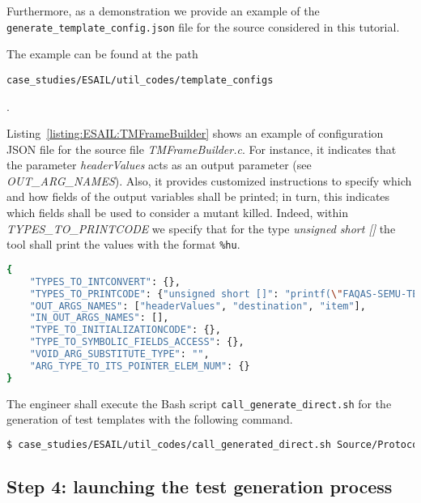 Furthermore, as a demonstration we provide an example of the \texttt{generate\_template\_config.json} file for the source considered in this tutorial.

The example can be found at the path \begin{small}\texttt{case\_studies/ESAIL/util\_codes/template\_configs}\end{small}.

Listing~\ref{listing:ESAIL:TMFrameBuilder} shows an example of configuration JSON file for the source file \emph{TMFrameBuilder.c}. For instance, it indicates that the parameter \emph{headerValues} acts as an output parameter (see \emph{OUT\_ARG\_NAMES}). Also, it provides customized instructions to specify which and how fields of the output variables shall be printed; in turn, this indicates which fields shall be used to consider a mutant killed. Indeed, within \emph{TYPES\_TO\_PRINTCODE} we specify that for the type \emph{unsigned short []} the tool shall print the values with the format \texttt{\%hu}.

\begin{lstlisting}[language=bash,label=listing:ESAIL:TMFrameBuilder,caption=JSON configuration file for TMFrameBuilder.c.]
{
    "TYPES_TO_INTCONVERT": {},
    "TYPES_TO_PRINTCODE": {"unsigned short []": "printf(\"FAQAS-SEMU-TEST_OUTPUT: headerValues = %hu\\n\", {});", "unsigned char []": "printf(\"FAQAS-SEMU-TEST_OUTPUT: destination = %hc\\n\", {});", "struct TmByteField_s": "printf(\"FAQAS-SEMU-TEST_OUTPUT: item.size = %u, item.data = %s\\n\", {}.size, {}.data);"},
    "OUT_ARGS_NAMES": ["headerValues", "destination", "item"],
    "IN_OUT_ARGS_NAMES": [],
    "TYPE_TO_INITIALIZATIONCODE": {},
    "TYPE_TO_SYMBOLIC_FIELDS_ACCESS": {},
    "VOID_ARG_SUBSTITUTE_TYPE": "",
    "ARG_TYPE_TO_ITS_POINTER_ELEM_NUM": {}
}
\end{lstlisting}

The engineer shall execute the Bash script \texttt{call\_generate\_direct.sh} for the generation of test templates with the following command.

\begin{lstlisting}[language=bash]
$ case_studies/ESAIL/util_codes/call_generated_direct.sh Source/ProtocolLayer/TMFrameBuilder/Source/TMFrameBuilder.c
\end{lstlisting}

\subsection{Step 4: launching the test generation process}

